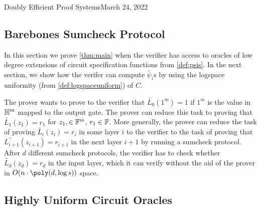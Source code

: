 \begin{lecture}{9}{Doubly Efficient Proof Systems}{March 24, 2022}
\subsection{Barebones Sumcheck Protocol}

In this section we prove \cref{thm:main} when the verifier has access to
oracles of low degree extensions of circuit specification functions from
\cref{def:psis}. In the next section, we show how the verifer can compute
$\tilde{\psi_i}$s by using the logspace uniformity (from
\cref{def:logspaceuniform}) of $C$.

The prover wants to prove to the verifier that $\tilde{L_0}(1^m) = 1$ if $1^m$
is the value in $\mathbb{H}^m$ mapped to the output gate. The prover can reduce this
task to proving that $\tilde{L_1}(z_1) = r_1$ for $z_1, \in \mathbb{F}^m$, $r_1 \in
\mathbb{F}$. More generally, the prover can reduce the task of proving
$\tilde{L_i}(z_i) = r_i$ in some layer $i$ to the verifier to the task of
proving that $\tilde{L_{i+1}}(z_{i+1}) = r_{i+1}$ in the next layer $i+1$ by
running a sumcheck protocol. After $d$ different sumcheck protocols, the
verifier has to check whether $\tilde{L_d}(z_d) = r_d$ in the input layer,
which it can verify without the aid of the prover in $O(n\cdot \poly(d, \log
s))$ space.

\subsection{Highly Uniform Circuit Oracles}

\end{lecture}
